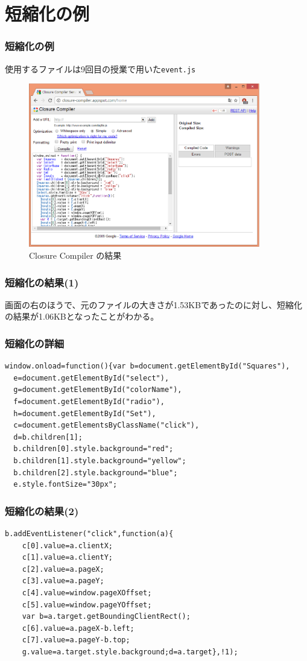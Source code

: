 \section{短縮化の例}
\begin{frame}[containsverbatim]
 \frametitle{短縮化の例}
 使用するファイルは9回目の授業で用いた\texttt{event.js}
 \begin{figure}[ht]
	\begin{center}
	 \includegraphics[width=0.9\textwidth]{../10-01closur-compiler-res01.eps}
	\end{center}
 \caption{Closure Compiler の結果}\label{closure-compiler-res01}
 \end{figure}
\end{frame}
\begin{frame}[containsverbatim]
\frametitle{短縮化の結果(1)}
 画面の右のほうで、元のファイルの大きさが1.53KBであったのに対し、短縮化
 の結果が1.06KBとなったことがわかる。
\end{frame}
\begin{frame}[containsverbatim]
 \frametitle{短縮化の詳細}
\begin{Verbatim}[fontsize=\footnotesize]
window.onload=function(){var b=document.getElementById("Squares"),
  e=document.getElementById("select"),
  g=document.getElementById("colorName"),
  f=document.getElementById("radio"),
  h=document.getElementById("Set"),
  c=document.getElementsByClassName("click"),
  d=b.children[1];
  b.children[0].style.background="red";
  b.children[1].style.background="yellow";
  b.children[2].style.background="blue";
  e.style.fontSize="30px";
\end{Verbatim}
\end{frame}
\begin{frame}[containsverbatim]
 \frametitle{短縮化の結果(2)}
 \begin{Verbatim}[fontsize=\footnotesize]
  b.addEventListener("click",function(a){
    c[0].value=a.clientX;
    c[1].value=a.clientY;
    c[2].value=a.pageX;
    c[3].value=a.pageY;
    c[4].value=window.pageXOffset;
    c[5].value=window.pageYOffset;
    var b=a.target.getBoundingClientRect();
    c[6].value=a.pageX-b.left;
    c[7].value=a.pageY-b.top;
    g.value=a.target.style.background;d=a.target},!1);
\end{Verbatim}
\end{frame}
